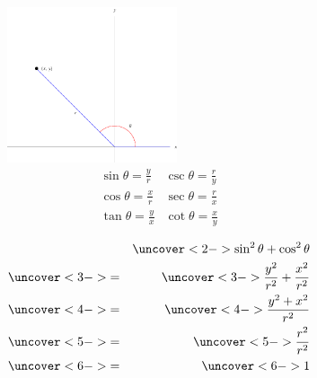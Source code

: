 \begin{frame}
\begin{columns}[c]
\includegraphics[width=5cm]{trigonometry/pictures/app-d-ratiosb.pdf}%
\[
\begin{array}{cc}
\sin \theta = \frac{ y}{ r} &
\csc \theta = \frac{ r}{ y} \\
\cos \theta = \frac{ x}{ r} &
\sec \theta = \frac{ r}{ x} \\
\tan \theta = \frac{ y}{ x} &
\cot \theta = \frac{ x}{ y} \\
\end{array}
\]
\begin{eqnarray*}
& & \uncover<2->{\sin^2 \theta + \cos^2 \theta}\\
& \uncover<3->{=} & \uncover<3->{\frac{y^2}{r^2} + \frac{x^2}{r^2}}\\
& \uncover<4->{=} & \uncover<4->{\frac{y^2+x^2}{r^2}}\\
& \uncover<5->{=} & \uncover<5->{\frac{r^2}{r^2}}\\
& \uncover<6->{=} & \uncover<6->{1}
\end{eqnarray*}
%
\end{columns}
\end{frame}


